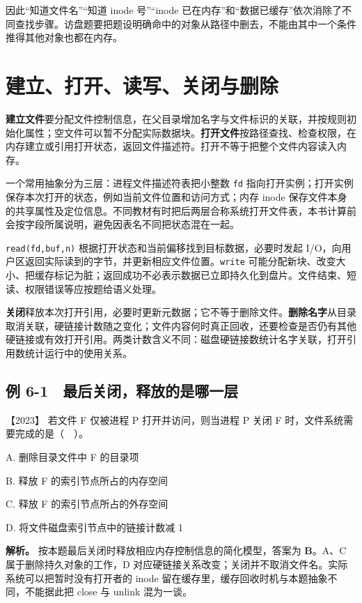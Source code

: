 因此``知道文件名''``知道 inode 号''``inode 已在内存''和``数据已缓存''依次消除了不同查找步骤。访盘题要把题设明确命中的对象从路径中删去，不能由其中一个条件推得其他对象也都在内存。

\section{建立、打开、读写、关闭与删除}\label{os-6-2}

\textbf{建立文件}要分配文件控制信息，在父目录增加名字与文件标识的关联，并按规则初始化属性；空文件可以暂不分配实际数据块。\textbf{打开文件}按路径查找、检查权限，在内存建立或引用打开状态，返回文件描述符。打开不等于把整个文件内容读入内存。

一个常用抽象分为三层：进程文件描述符表把小整数 \texttt{fd} 指向打开实例；打开实例保存本次打开的状态，例如当前文件位置和访问方式；内存 inode 保存文件本身的共享属性及定位信息。不同教材有时把后两层合称系统打开文件表，本书计算前会按字段所属说明，避免因表名不同把状态混在一起。

\texttt{read(fd,}\allowbreak{}\texttt{buf,}\allowbreak{}\texttt{n)} 根据打开状态和当前偏移找到目标数据，必要时发起 I/O，向用户区返回实际读到的字节，并更新相应文件位置。\texttt{write} 可能分配新块、改变大小、把缓存标记为脏；返回成功不必表示数据已立即持久化到盘片。文件结束、短读、权限错误等应按题给语义处理。

\textbf{关闭}释放本次打开引用，必要时更新元数据；它不等于删除文件。\textbf{删除名字}从目录取消关联，硬链接计数随之变化；文件内容何时真正回收，还要检查是否仍有其他硬链接或有效打开引用。两类计数含义不同：磁盘硬链接数统计名字关联，打开引用数统计运行中的使用关系。

\subsection{例 6-1　最后关闭，释放的是哪一层}\label{os-ex6-1}

\noindent{}【2023】 若文件 F 仅被进程 P 打开并访问，则当进程 P 关闭 F 时，文件系统需要完成的是（　）。

A. 删除目录文件中 F 的目录项

B. 释放 F 的索引节点所占的内存空间

C. 释放 F 的索引节点所占的外存空间

D. 将文件磁盘索引节点中的链接计数减 1


\textbf{解析。} 按本题最后关闭时释放相应内存控制信息的简化模型，答案为 \textbf{B}。A、C 属于删除持久对象的工作，D 对应硬链接关系改变；关闭并不取消文件名。实际系统可以把暂时没有打开者的 inode 留在缓存里，缓存回收时机与本题抽象不同，不能据此把 close 与 unlink 混为一谈。

